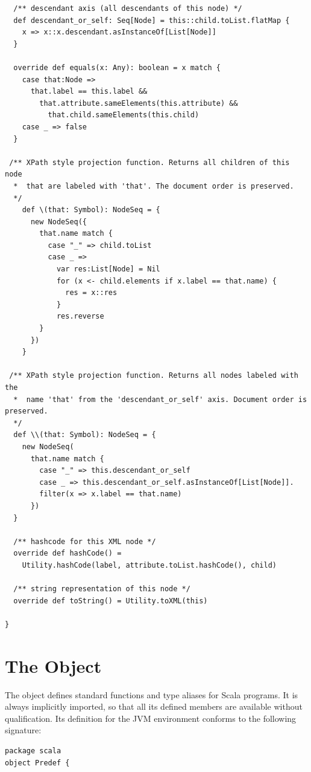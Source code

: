 {\begin{lstlisting}
  /** descendant axis (all descendants of this node) */
  def descendant_or_self: Seq[Node] = this::child.toList.flatMap { 
    x => x::x.descendant.asInstanceOf[List[Node]] 
  } 

  override def equals(x: Any): boolean = x match {
    case that:Node => 
      that.label == this.label && 
        that.attribute.sameElements(this.attribute) && 
          that.child.sameElements(this.child)
    case _ => false
  } 

 /** XPath style projection function. Returns all children of this node
  *  that are labeled with 'that'. The document order is preserved.
  */
    def \(that: Symbol): NodeSeq = {
      new NodeSeq({
        that.name match {
          case "_" => child.toList  
          case _ =>
            var res:List[Node] = Nil 
            for (x <- child.elements if x.label == that.name) {
              res = x::res 
            }
            res.reverse
        }
      }) 
    }

 /** XPath style projection function. Returns all nodes labeled with the 
  *  name 'that' from the 'descendant_or_self' axis. Document order is preserved.
  */
  def \\(that: Symbol): NodeSeq = {
    new NodeSeq(
      that.name match {
        case "_" => this.descendant_or_self 
        case _ => this.descendant_or_self.asInstanceOf[List[Node]].
        filter(x => x.label == that.name) 
      })
  }

  /** hashcode for this XML node */
  override def hashCode() = 
    Utility.hashCode(label, attribute.toList.hashCode(), child) 

  /** string representation of this node */
  override def toString() = Utility.toXML(this) 

}
\end{lstlisting}

\newpage
\section{The \large{} Object}\label{cls:predef}

The  object defines standard functions and type aliases
for Scala programs. It is always implicitly imported, so that all its
defined members are available without qualification. Its definition
for the JVM environment conforms to the following signature:

\begin{lstlisting}
package scala
object Predef {


\end{lstlisting}}
